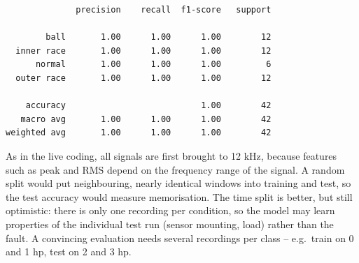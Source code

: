 \documentclass[
  letterpaper,
  DIV=11,
  numbers=noendperiod]{scrreprt}
\begin{document}
\begin{tcolorbox}
\begin{verbatim}
              precision    recall  f1-score   support

        ball       1.00      1.00      1.00        12
  inner race       1.00      1.00      1.00        12
      normal       1.00      1.00      1.00         6
  outer race       1.00      1.00      1.00        12

    accuracy                           1.00        42
   macro avg       1.00      1.00      1.00        42
weighted avg       1.00      1.00      1.00        42
\end{verbatim}

As in the live coding, all signals are first brought to 12 kHz, because
features such as peak and RMS depend on the frequency range of the
signal. A random split would put neighbouring, nearly identical windows
into training and test, so the test accuracy would measure memorisation.
The time split is better, but still optimistic: there is only one
recording per condition, so the model may learn properties of the
individual test run (sensor mounting, load) rather than the fault. A
convincing evaluation needs several recordings per class -- e.g.~train
on 0 and 1 hp, test on 2 and 3 hp.

\end{tcolorbox}
\end{document}
